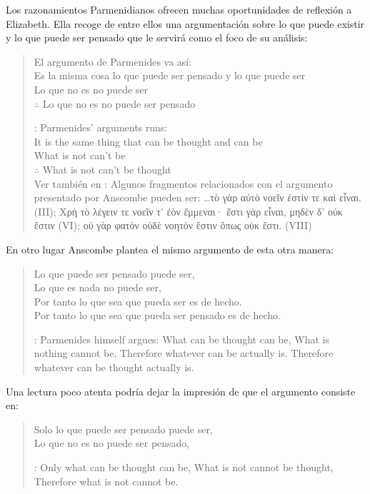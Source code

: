Los razonamientos Parmenidianos ofrecen muchas oportunidades de reflexión a Elizabeth. Ella recoge de entre ellos una argumentación sobre lo que puede existir y lo que puede ser pensado que le servirá como el foco de su análisis:
\blockquote[{\cite[3]{anscombe1981parmenides:pmc}}: Parmenides' arguments runs:\\
It is the same thing that can be thought and can be\\
What is not can't be\\
$\therefore$ What is not can't be thought\\
Ver también en {\cite[22--25]{parmenides2007poema}}: Algunos fragmentos relacionados con el argumento presentado por Anscombe pueden ser: \ldots\textgreek{τὸ γὰρ αὐτὸ νοεῖν ἐστίν τε καὶ εἶναι.} (III); \textgreek{Χρὴ τὸ λέγειν τε νοεῖν τ' ἐὸν ἔμμεναι· ἔστι γὰρ εἶναι, μηδὲν δ' οὐκ ἔστιν} (VI); \textelp{} \textgreek{οὐ γὰρ φατὸν οὐδὲ νοητόν ἔστιν ὅπως οὐκ ἔστι.} (VIII)]{El argumento de Parmenides va así:\\
  Es la misma cosa lo que puede ser pensado y lo que puede ser\\
  Lo que no es no puede ser\\
  $\therefore$ Lo que no es no puede ser pensado} En otro lugar Anscombe plantea el mismo argumento de esta otra manera: \blockquote[{\cite[vii]{anscombe1981parmenides}}: Parmenides himself argues: What can be thought can be, What is nothing cannot be, Therefore whatever can be actually is. Therefore whatever can be thought actually is.]{Lo que puede ser pensado puede ser,\\
  Lo que es nada no puede ser,\\
  Por tanto lo que sea que pueda ser es de hecho.\\
  Por tanto lo que sea que pueda ser pensado es de hecho.} Una lectura poco atenta podría dejar la impresión de que el argumento consiste en: \blockquote[{\cite[vii]{anscombe1981parmenides}}: Only what can be thought can be, What is not cannot be thought, Therefore what is not cannot be.]{Solo lo que puede ser pensado puede ser,\\
  Lo que no es no puede ser pensado,\\
}
